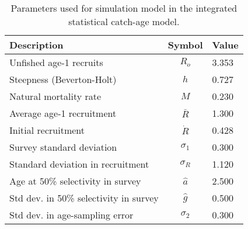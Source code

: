 \begin{table}[!tbh]
	\caption{Parameters used for simulation model in the integrated statistical catch-age model.}
	\label{table:simulationpars}
	\begin{center}
		\begin{tabular}{l|cl}
		\hline

		\hline
		\textbf{Description} & \textbf{Symbol} & \textbf{Value} \\
		\hline	
			 Unfished age-1 recruits 			& $R_o$ 	 & 3.353 \\
			 Steepness (Beverton-Holt) 			& $h$ 		 & 0.727 \\
			 Natural mortality rate 			& $M$		 & 0.230 \\
			 Average age-1 recruitment			& $\bar{R}$	 & 1.300 \\
			 Initial recruitment 				& $\dot{R}$  & 0.428 \\
			 Survey standard deviation 	   		& $\sigma_1$ & 0.300 \\
			 Standard deviation in recruitment	& $\sigma_R$ & 1.120 \\
			 Age at 50\% selectivity in survey  & $\hat{a}$  & 2.500 \\
			 Std dev. in 50\% selectivity in survey  & $\hat{g}$  & 0.500 \\
			 Std dev. in age-sampling error          & $\sigma_2$ & 0.300\\
		\hline

		\hline
		\end{tabular}
	\end{center}
\end{table}



